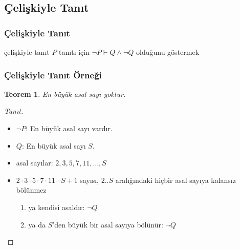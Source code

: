 \documentclass[dvipsnames]{beamer}
\theoremstyle{definition}
\theoremstyle{example}
\theoremstyle{plain}
\newtheorem{teorem}[theorem]{Teorem}
\begin{document}
\subsection{Çelişkiyle Tanıt}

\begin{frame}
  \frametitle{Çelişkiyle Tanıt}

  \begin{block}{çelişkiyle tanıt}
    $P$ tanıtı için $\neg P \vdash Q \wedge \neg Q$ olduğunu göstermek
  \end{block}
\end{frame}

\begin{frame}
  \frametitle{Çelişkiyle Tanıt Örneği}

  \begin{teorem}
    En büyük asal sayı yoktur.
  \end{teorem}

  \pause
  \begin{proof}[Tanıt]
    \begin{itemize}
      \item $\neg P$: En büyük asal sayı vardır.

      \pause
      \item $Q$: En büyük asal sayı $S$.

      \pause
      \item asal sayılar: $2,3,5,7,11,\dots,S$

      \pause
      \item $2 \cdot 3 \cdot 5 \cdot 7 \cdot 11 \cdots S + 1$ sayısı, $2..S$
        aralığındaki hiçbir asal sayıya kalansız bölünmez

      \pause
      \begin{enumerate}
        \item ya kendisi asaldır: $\neg Q$

        \pause
        \item ya da $S$'den büyük bir asal sayıya bölünür: $\neg Q$
      \end{enumerate}
    \end{itemize}
  \end{proof}
\end{frame}
\end{document}
